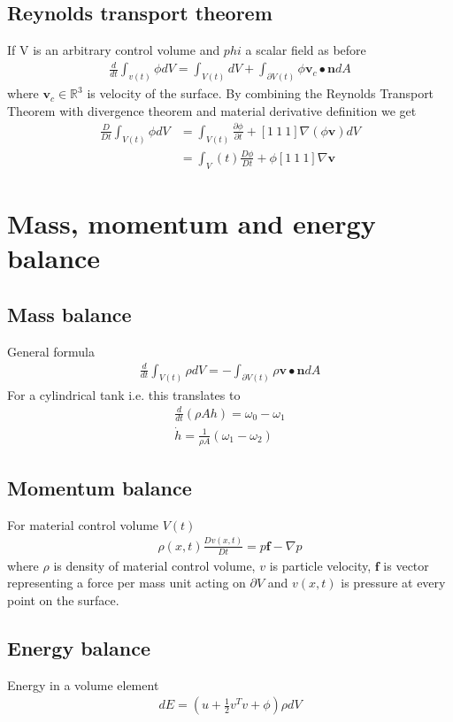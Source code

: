 \subsection{Reynolds transport theorem}
If V is an arbitrary control volume and $phi$ a scalar field as before
\begin{align}
    \frac{d}{dt}\int_{v(t)}\phi dV = \int_{V(t)} dV + \int_{\partial V(t)}\phi \mathbf{v}_c\bullet \mathbf{n} dA
\end{align}
where $\mathbf{v}_c \in \mathbb{R}^3$ is velocity of the surface. By combining the Reynolds Transport Theorem with divergence theorem and material derivative definition we get
\begin{align}
    \frac{D}{Dt}\int_{V(t)}\phi dV & = \int_{V(t)}\frac{\partial\phi}{\partial t}+[1\:1\: 1]\nabla (\phi \mathbf{v}) dV \\
    & = \int_V(t)\frac{D\phi}{Dt}+\phi[1\:1\: 1]\nabla \mathbf{v}
\end{align}

\section{Mass, momentum and energy balance}
\subsection{Mass balance}
General formula
\begin{align}
    \frac{d}{dt}\int_{V(t)}\rho dV = -\int_{\partial V(t)}\rho \mathbf{v}\bullet\mathbf{n}dA
\end{align}
For a cylindrical tank i.e. this translates to 
\begin{align}
    \frac{d}{dt}(\rho A h) = \omega_0-\omega_1 \\
    \Dot{h} = \frac{1}{\rho A}(\omega_1-\omega_2)
\end{align}

\subsection{Momentum balance}
For material control volume $V(t)$
\begin{align}
    \rho(x,t)\frac{Dv(x,t)}{Dt}=p\mathbf{f}-\nabla p
\end{align}
where $\rho$ is density of material control volume, $v$ is particle velocity, $\mathbf{f}$ is vector representing a force per mass unit acting on $\partial V$ and $v(x,t)$ is pressure at every point on the surface.

\subsection{Energy balance}
Energy in a volume element
\begin{align}
    dE = (u + \frac{1}{2}v^Tv+\phi)\rho dV
\end{align}